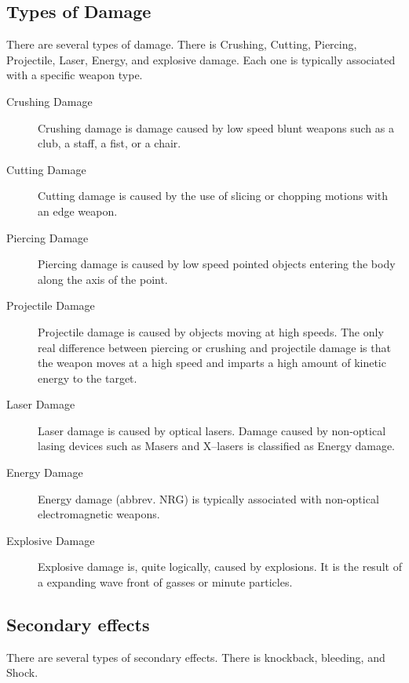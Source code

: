 \subsection{Types of Damage}

There are several types of damage. There is Crushing, Cutting,
Piercing, Projectile, Laser, Energy, and explosive damage. Each one
is typically associated with a specific weapon type.

\begin{description}
	\item[Crushing Damage]
	Crushing damage is damage caused by low speed blunt weapons such as
	a club, a staff, a fist, or a chair.

	\item[Cutting Damage]
	Cutting damage is caused by the use of slicing or chopping motions
	with an edge weapon.

	\item[Piercing Damage]
	Piercing damage is caused by low speed pointed objects entering the
	body along the axis of the point.

	\item[Projectile Damage]
	Projectile damage is caused by objects moving at high speeds. The
	only real difference between piercing or crushing and projectile
	damage is that the weapon moves at a high speed and imparts a
	high amount of kinetic energy to the target.

	\item[Laser Damage]
	Laser damage is caused by optical lasers. Damage caused by
	non-optical lasing devices such as Masers and X--lasers is classified
	as Energy damage.

	\item[Energy Damage]
	Energy damage (abbrev. NRG) is typically associated with non-optical
	electromagnetic weapons.

	\item[Explosive Damage]
	Explosive damage is, quite logically, caused by explosions. It is
	the result of a expanding wave front of gasses or minute particles.

\end{description}

\subsection{Secondary effects}

There are several types of secondary effects. There is knockback,
bleeding, and Shock.

